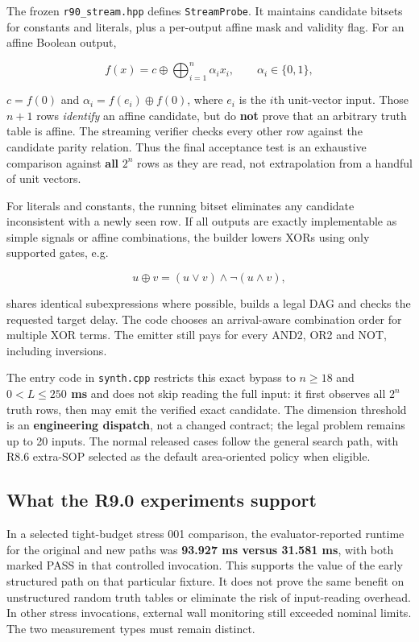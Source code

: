 The frozen \texttt{r90\_stream.hpp} defines \texttt{StreamProbe}. It maintains candidate bitsets for constants and literals, plus a per-output affine mask and validity flag. For an affine Boolean output,

\[
f(x)=c\oplus\bigoplus_{i=1}^{n}\alpha_i x_i,
\qquad \alpha_i\in\{0,1\},
\]

\(c=f(0)\) and \(\alpha_i=f(e_i)\oplus f(0)\), where \(e_i\) is the \(i\)th unit-vector input. Those \(n+1\) rows \emph{identify} an affine candidate, but do \textbf{not} prove that an arbitrary truth table is affine. The streaming verifier checks every other row against the candidate parity relation. Thus the final acceptance test is an exhaustive comparison against \textbf{all} \(2^n\) rows as they are read, not extrapolation from a handful of unit vectors.

For literals and constants, the running bitset eliminates any candidate inconsistent with a newly seen row. If all outputs are exactly implementable as simple signals or affine combinations, the builder lowers XORs using only supported gates, e.g.

\[
u\oplus v=(u\lor v)\land\neg(u\land v),
\]

shares identical subexpressions where possible, builds a legal DAG and checks the requested target delay. The code chooses an arrival-aware combination order for multiple XOR terms. The emitter still pays for every AND2, OR2 and NOT, including inversions.

The entry code in \texttt{synth.cpp} restricts this exact bypass to \textbf{\(n\ge18\)} and \textbf{\(0<L\le250\) ms} and does not skip reading the full input: it first observes all \(2^n\) truth rows, then may emit the verified exact candidate. The dimension threshold is an \textbf{engineering dispatch}, not a changed contract; the legal problem remains up to 20 inputs. The normal released cases follow the general search path, with R8.6 extra-SOP selected as the default area-oriented policy when eligible.

\subsection{What the R9.0 experiments support}\label{what-the-r9.0-experiments-support}

In a selected tight-budget stress 001 comparison, the evaluator-reported runtime for the original and new paths was \textbf{93.927 ms versus 31.581 ms}, with both marked PASS in that controlled invocation. This supports the value of the early structured path on that particular fixture. It does not prove the same benefit on unstructured random truth tables or eliminate the risk of input-reading overhead. In other stress invocations, external wall monitoring still exceeded nominal limits. The two measurement types must remain distinct.

